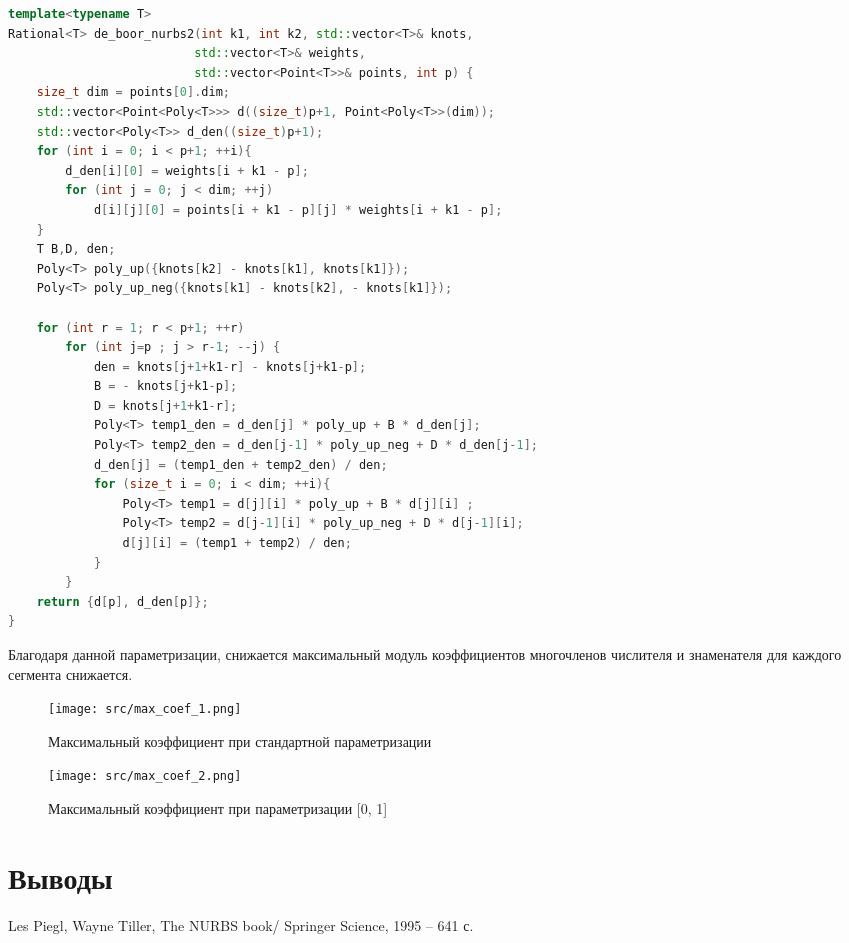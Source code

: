 \documentclass{article}
\begin{document}
\begin{lstlisting}[language=C++,frame=single,caption=Модифицированный алгоритм де Бура для построения полиномов NURBS кривой с параметризацией \text{[0, 1]}.,label=code1]
template<typename T>
Rational<T> de_boor_nurbs2(int k1, int k2, std::vector<T>& knots,
                          std::vector<T>& weights,
                          std::vector<Point<T>>& points, int p) {
    size_t dim = points[0].dim;
    std::vector<Point<Poly<T>>> d((size_t)p+1, Point<Poly<T>>(dim));
    std::vector<Poly<T>> d_den((size_t)p+1);
    for (int i = 0; i < p+1; ++i){
        d_den[i][0] = weights[i + k1 - p];
        for (int j = 0; j < dim; ++j)
            d[i][j][0] = points[i + k1 - p][j] * weights[i + k1 - p];
    }
    T B,D, den;
    Poly<T> poly_up({knots[k2] - knots[k1], knots[k1]});
    Poly<T> poly_up_neg({knots[k1] - knots[k2], - knots[k1]});

    for (int r = 1; r < p+1; ++r) 
        for (int j=p ; j > r-1; --j) {
            den = knots[j+1+k1-r] - knots[j+k1-p];
            B = - knots[j+k1-p];
            D = knots[j+1+k1-r];
            Poly<T> temp1_den = d_den[j] * poly_up + B * d_den[j];
            Poly<T> temp2_den = d_den[j-1] * poly_up_neg + D * d_den[j-1];
            d_den[j] = (temp1_den + temp2_den) / den;
            for (size_t i = 0; i < dim; ++i){
                Poly<T> temp1 = d[j][i] * poly_up + B * d[j][i] ;
                Poly<T> temp2 = d[j-1][i] * poly_up_neg + D * d[j-1][i];
                d[j][i] = (temp1 + temp2) / den;
            }
        }
    return {d[p], d_den[p]};
}
\end{lstlisting} 


Благодаря данной параметризации, снижается максимальный модуль коэффициентов многочленов числителя и знаменателя для каждого сегмента снижается.

\begin{figure}[H] 
    \centering
        \texttt{[image: src/max\_coef\_1.png]}
        \caption {Максимальный коэффициент при стандартной параметризации}
        \label{fig:max_coef_1}
\end{figure}


\begin{figure}[H] 
    \centering
        \texttt{[image: src/max\_coef\_2.png]}
        \caption {Максимальный коэффициент при параметризации [0, 1]}
        \label{fig:max_coef_2}
\end{figure}



\pagebreak
\section{Выводы}

    
\pagebreak
\begin{thebibliography}{1}
 Les Piegl, Wayne Tiller, The NURBS book/ Springer Science,  1995 – 641 с.
\end{thebibliography}
\end{document}
